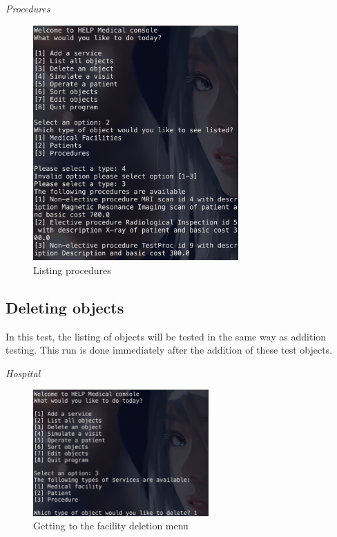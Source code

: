 \documentclass{article}
\begin{document}
	\textit{Procedures}
	\begin{figure}
		\begin{center}
			\includegraphics[width=0.7\textwidth]{figures/Listing/Listing_Procedures.png}
		\end{center}
		\caption{Listing procedures}\label{fig:listing_procedures}
	\end{figure}

	\subsection{Deleting objects}\label{sub:deleting_objects} %
	In this test, the listing of objects will be tested in the same way as addition testing. This run is done immediately after the addition of these test objects.

	\textit{Hospital}
	\begin{figure}
		\begin{center}
			\includegraphics[width=0.6\textwidth]{figures/Deleting/Deleting_Hospital_01.png}
		\end{center}
		\caption{Getting to the facility deletion menu}\label{fig:deleting_hospital_01}
	\end{figure}
	
\end{document}
